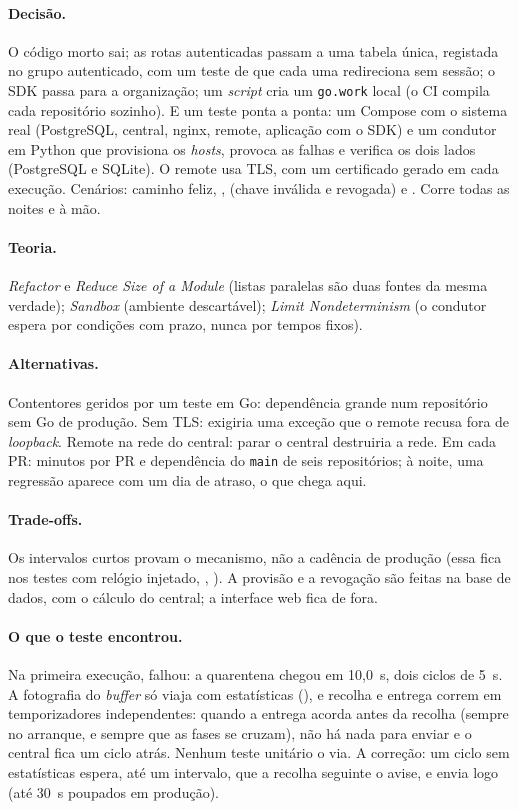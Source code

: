 \paragraph{Decisão.}
O código morto sai; as rotas autenticadas passam a uma tabela única, registada no grupo autenticado, com um teste
de que cada uma redireciona sem sessão; o SDK passa para a organização; um \emph{script} cria um \texttt{go.work}
local (o CI compila cada repositório sozinho). E um teste ponta a ponta: um Compose com o sistema real (PostgreSQL,
central, nginx, remote, aplicação com o SDK) e um condutor em Python que provisiona os \emph{hosts}, provoca as
falhas e verifica os dois lados (PostgreSQL e SQLite). O remote usa TLS, com um certificado gerado em cada execução.
Cenários: caminho feliz, ,  (chave inválida e revogada) e . Corre todas as noites e à
mão.

\paragraph{Teoria.}
\emph{Refactor} e \emph{Reduce Size of a Module} (listas paralelas são duas fontes da mesma verdade);
\emph{Sandbox} (ambiente descartável); \emph{Limit Nondeterminism} (o condutor espera por condições com prazo, nunca
por tempos fixos).

\paragraph{Alternativas.}
Contentores geridos por um teste em Go: dependência grande num repositório sem Go de produção. Sem TLS: exigiria
uma exceção que o remote recusa fora de \emph{loopback}. Remote na rede do central: parar o central destruiria a
rede. Em cada PR: minutos por PR e dependência do \texttt{main} de seis repositórios; à noite, uma regressão
aparece com um dia de atraso, o que chega aqui.

\paragraph{Trade-offs.}
Os intervalos curtos provam o mecanismo, não a cadência de produção (essa fica nos testes com relógio injetado,
, ). A provisão e a revogação são feitas na base de dados, com o cálculo do central; a interface
web fica de fora.

\paragraph{O que o teste encontrou.}
Na primeira execução,  falhou: a quarentena chegou em 10,0~s, dois ciclos de 5~s. A fotografia do
\emph{buffer} só viaja com estatísticas (), e recolha e entrega correm em temporizadores independentes:
quando a entrega acorda antes da recolha (sempre no arranque, e sempre que as fases se cruzam), não há nada para
enviar e o central fica um ciclo atrás. Nenhum teste unitário o via. A correção: um ciclo sem estatísticas espera,
até um intervalo, que a recolha seguinte o avise, e envia logo (até 30~s poupados em produção).

